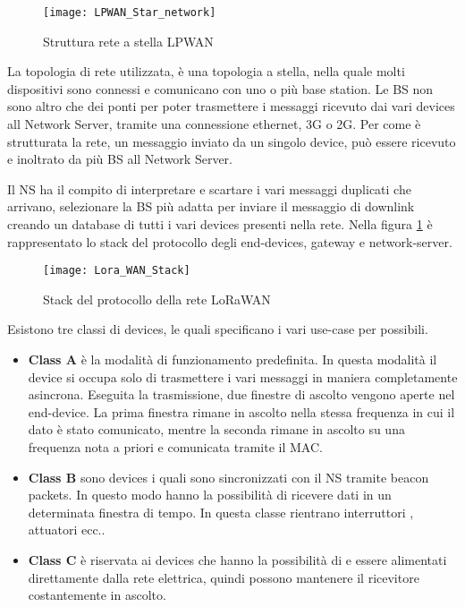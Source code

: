 \begin{figure}[h]
\centering 
\texttt{[image: LPWAN\_Star\_network]}
\caption{Struttura rete a stella LPWAN}
\end{figure}

La topologia di rete utilizzata, è una topologia a stella, nella quale molti
dispositivi sono connessi e comunicano con uno o più base station. Le BS non
sono altro che dei ponti per poter trasmettere i messaggi ricevuto dai vari
devices all Network Server, tramite una connessione ethernet, 3G o 2G. 
Per come è strutturata la rete, un messaggio inviato
da un singolo device, può essere ricevuto e inoltrato da più BS all Network
Server.

Il NS ha il compito di interpretare e scartare i vari messaggi duplicati che
arrivano, selezionare la BS più adatta per inviare il messaggio di downlink
creando un database di tutti i vari devices presenti nella rete. Nella figura
\ref{fig:stack_lora} è rappresentato lo stack del protocollo degli end-devices,
gateway  e network-server. 

\begin{figure}[h]
\centering 
\texttt{[image: Lora\_WAN\_Stack]}
\caption{Stack del protocollo della rete LoRaWAN}
\label{fig:stack_lora}
\end{figure}

Esistono tre classi di devices, le quali specificano i vari use-case per
possibili.

\begin{itemize}
\item \textbf{Class A} è la modalità di funzionamento predefinita. In questa
modalità il device si occupa solo di trasmettere i vari messaggi in maniera
completamente asincrona. Eseguita la trasmissione, due finestre di ascolto
vengono aperte nel end-device. La prima finestra rimane in ascolto nella stessa
frequenza in cui il dato è stato comunicato, mentre la seconda rimane in ascolto
su una frequenza nota a priori e comunicata tramite il MAC.
\item \textbf{Class B} sono devices i quali sono sincronizzati con il NS tramite
beacon packets. In questo modo hanno la possibilità di ricevere dati in un
determinata finestra di tempo. In questa classe rientrano interruttori ,
attuatori ecc..
\item \textbf{Class C} è riservata ai devices che hanno la possibilità di e
essere alimentati direttamente dalla rete elettrica, quindi possono mantenere il
ricevitore costantemente in ascolto.
\end{itemize}

